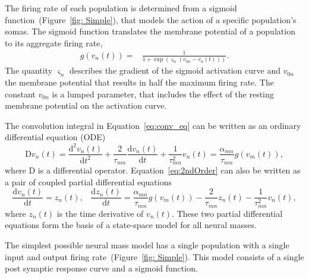 The firing rate of each population is determined from a sigmoid function~(Figure~\ref{fig: Simple}), that models the action of a specific population's somas. The sigmoid function translates the membrane potential of a population to its aggregate firing rate,
\begin{align}\label{eq:sigmoid}
    g\left(v_n(t)\right) =& \frac{1}{1+\exp{\left(\varsigma_n\left(v_{0n} - v_n(t)\right)\right)}}.
\end{align}
The quantity $\varsigma_n$ describes the gradient of the sigmoid activation curve and $v_{0n}$ the membrane potential that results in half the maximum firing rate. The constant $v_{0n}$ is a lumped parameter, that includes the effect of the resting membrane potential on the activation curve. 

The convolution integral in Equation~\ref{eq:conv_eq} can be written as an ordinary differential equation (ODE)
\begin{equation}\label{eq:2ndOrder}
    \mathrm{D}v_n(t) = \frac{\mathrm{d}^2 v_n(t)}{\mathrm{d}t^2} + \frac{2}{\tau_{mn}}\frac{\mathrm{d} v_n(t)}{\mathrm{d}t} + \frac{1}{\tau_{mn}^2} v_n(t) = \frac{\alpha_{mn}}{\tau_{mn}} g(v_m(t)),
\end{equation}
where $\mathrm{D}$ is a differential operator. Equation~\ref{eq:2ndOrder} can also be written as a pair of coupled partial differential equations
\begin{equation} \label{eq:2ndOrderNMM}
    \frac{\mathrm{d} v_n(t)}{\mathrm{d}t} = z_n(t),\,\,\,\,\,    \frac{\mathrm{d}z_n(t)}{\mathrm{d}t} = \frac{\alpha_{mn}}{\tau_{mn}} g(v_m(t)) - \frac{2}{\tau_{mn}}z_n(t) - \frac{1}{\tau_{mn}^2} v_n(t),
\end{equation}
where $z_n(t)$ is the time derivative of $v_n(t)$. These two partial differential equations form the basis of a state-space model for all neural masses.

The simplest possible neural mass model has a single population with a single input and output firing rate~(Figure~\ref{fig: Simple}). This model consists of a single post synaptic response curve and a sigmoid function.

